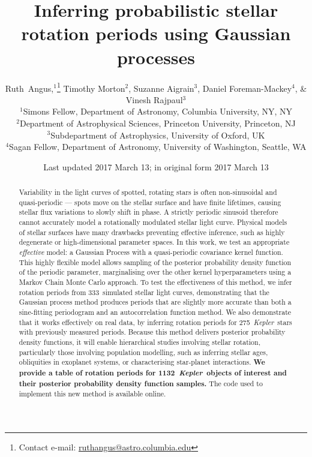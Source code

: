 \documentclass[a4paper,fleqn,usenatbib,useAMS]{mnras}
\title[GP rotation periods]{Inferring probabilistic stellar rotation periods
using Gaussian processes}
\author[R.~Angus \emph{et al.}]{
    Ruth~Angus,$^1$\thanks{Contact e-mail:
\href{mailto:ruthangus@astro.columbia.edu}{ruthangus@astro.columbia.edu}}
    Timothy Morton$^2$,
    Suzanne Aigrain$^3$,
    Daniel Foreman-Mackey$^4$,
    \newauthor
    \& Vinesh Rajpaul$^3$
    \\
    $^1$Simons Fellow, Department of Astronomy, Columbia University, NY, NY \\
    $^2$Department of Astrophysical Sciences, Princeton University,
    Princeton, NJ \\
    $^3$Subdepartment of Astrophysics, University of Oxford, UK \\
    $^4$Sagan Fellow, Department of Astronomy, University of Washington,
    Seattle, WA}
\date{Last updated 2017 March 13; in original form 2017 March 13}
\newcommand{\Kepler}{{\it Kepler}}
\newcommand{\LSST}{{\it LSST}}
\newcommand{\nkoi}{1132}
\newcommand{\naigrain}{333}
\newcommand{\nkoimcq}{275}
\begin{document}
\label{firstpage}
\pagerange{\pageref{firstpage}--\pageref{lastpage}}
\maketitle

\begin{abstract}
Variability in the light curves of spotted, rotating stars is often
    non-sinusoidal and quasi-periodic --- spots move on the stellar surface
    and have finite lifetimes, causing stellar flux variations to slowly shift
    in phase.
A strictly periodic sinusoid therefore cannot accurately model a rotationally
    modulated stellar light curve.
Physical models of stellar surfaces have many drawbacks preventing effective
    inference, such as highly degenerate or high-dimensional parameter spaces.
In this work, we test an appropriate {\it effective} model: a Gaussian
    Process with a quasi-periodic covariance kernel function.
This highly flexible model allows sampling of the posterior probability
    density function of the periodic parameter, marginalising over the
    other kernel hyperparameters using a Markov Chain Monte Carlo approach.
To test the effectiveness of this method, we infer rotation periods from
    \naigrain\ simulated stellar light curves, demonstrating that the Gaussian
    process method produces periods that are slightly more accurate than both
    a sine-fitting periodogram and an autocorrelation function method.
We also demonstrate that it works effectively on real data, by inferring
    rotation periods for \nkoimcq\ \Kepler\ stars with previously measured
    periods.
Because this method delivers posterior probability density functions, it will
    enable hierarchical studies involving stellar rotation, particularly those
    involving population modelling, such as inferring stellar ages,
    obliquities in exoplanet systems, or characterising star-planet
    interactions.
    {\bf We provide a table of rotation periods for \nkoi\ \Kepler\ objects of
    interest and their posterior probability density function samples.}
    The code used to implement this new method is available online.

\end{abstract}
\end{document}
